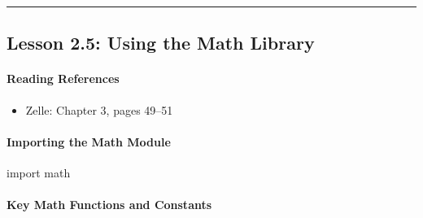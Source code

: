 \documentclass[
  justified,
  openright,
]{tufte-book}
\let\subsubsection\paragraph
\let\paragraph\paragraph
\newcommand{\ImportTok}[1]{\textcolor{BrandAccent}{#1}}
\newcommand{\NormalTok}[1]{#1}
\newenvironment{Shaded}{%
  \begin{snugshade}
}{%
  \end{snugshade}
}
\let\subsubsection\paragraph
\let\paragraph\paragraph
\providecommand{\tightlist}{%
  \setlength{\itemsep}{0pt}\setlength{\parskip}{0pt}}
\begin{document}
\begin{center}\rule{0.5\linewidth}{0.5pt}\end{center}

\subsection{Lesson 2.5: Using the Math
Library}\label{lesson-2.5-using-the-math-library}

\subsubsection{Reading References}\label{reading-references-11}

\begin{itemize}
\tightlist
\item
  Zelle: Chapter 3, pages 49--51
\end{itemize}

\subsubsection{Importing the Math
Module}\label{importing-the-math-module}

\begin{Shaded}
\begin{Highlighting}[]
\ImportTok{import}\NormalTok{ math}
\end{Highlighting}
\end{Shaded}

\subsubsection{Key Math Functions and
Constants}\label{key-math-functions-and-constants}
\end{document}
